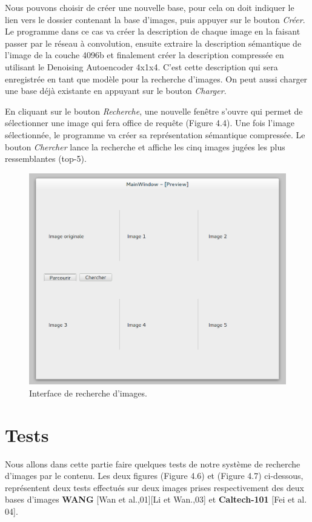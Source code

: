 	Nous pouvons choisir de créer une nouvelle base, pour cela on doit indiquer le lien vers le dossier contenant la base d'images, puis appuyer sur le bouton \textit{Créer}. Le programme dans ce cas va créer la description de chaque image en la faisant passer par le réseau à convolution, ensuite extraire la description sémantique de l'image de la couche 4096b et finalement créer la description compressée en utilisant le Denoising Autoencoder 4x1x4.
	C'est cette description qui sera enregistrée en tant que modèle pour la recherche d'images. On peut aussi charger une base déjà existante en appuyant sur le bouton \textit{Charger}.

	En cliquant sur le bouton \textit{Recherche}, une nouvelle fenêtre s'ouvre qui permet de sélectionner une image qui fera office de requête (Figure 4.4). Une fois l'image sélectionnée, le programme va créer sa représentation sémantique compressée. Le bouton \textit{Chercher} lance la recherche et affiche les cinq images jugées les plus ressemblantes (top-5).

\begin{figure}[H]
	\centering
		\includegraphics[width=4.5in]{Figures/search.png}
	\caption[]{Interface de recherche d'images.}
	\label{fig:Electron}
\end{figure}

\section{Tests}

	Nous allons dans cette partie faire quelques tests de notre système de recherche d'images par le contenu. Les deux figures (Figure 4.6) et (Figure 4.7) ci-dessous, représentent deux tests effectués sur deux images prises respectivement des deux bases d'images \textbf{WANG} [Wan et al.,01][Li et Wan.,03] et \textbf{Caltech-101} [Fei et al. 04].
	
